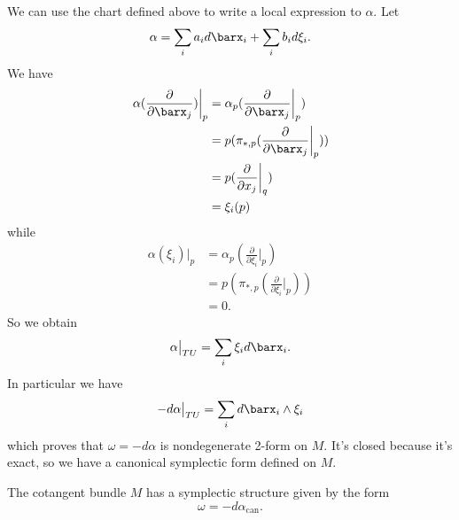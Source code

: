 We can use the chart defined above to write a local expression to $\alpha$. Let 
\begin{equation}
    \alpha = \sum_ia_id\barx_i+\sum_ib_id\xi_i.
\end{equation}
We have 
\begin{equation}
    \begin{split}
        \alpha(\frac{\partial}{\partial\barx_j})\bigg|_p &=\alpha_p(\frac{\partial}{\partial\barx_j}\bigg|_p)\\
        &=p(\pi_{*,p}(\frac{\partial}{\partial\barx_j}\bigg|_p))\\
        &=p(\frac{\partial}{\partial x_j}\bigg|_q)\\
        &=\xi_i(p)
    \end{split}
\end{equation}
while 
\begin{equation}
    \begin{split}
        \alpha(\xi_i)\bigg|_p &=\alpha_p(\frac{\partial}{\partial\xi_i}\bigg|_p)\\
        &=p(\pi_{*,p}(\frac{\partial}{\partial\xi_i}\bigg|_p))\\
        &=0.
    \end{split}
\end{equation}
So we obtain 
    \begin{equation}
        \alpha\big|_{TU} = \sum_i\xi_id\barx_i.
    \end{equation}
In particular we have  
\begin{equation}
   - d\alpha\big|_{TU} = \sum_i d\barx_i\wedge \xi_i
\end{equation}
which proves that $\omega=-d\alpha$ is nondegenerate 2-form on $M$. It's closed because it's exact, so we have a canonical 
symplectic form defined on $M$. 
\begin{dang}
    \begin{theorem}
        The cotangent bundle $M$ has a symplectic structure given by the form 
        \begin{equation}
            \omega = -d\alpha_{\text{can}}.
        \end{equation}
    \end{theorem}
\end{dang}

